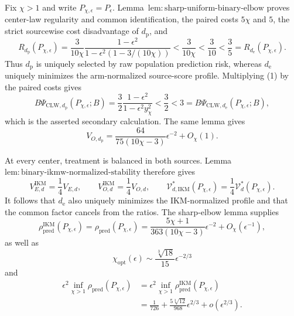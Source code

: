 Fix \(\chi>1\) and write \(P_{\chi,\epsilon}=P_\epsilon\). Lemma~\(\mathrm{lem{:}sharp\text{-}uniform\text{-}binary\text{-}elbow}\) proves center-law regularity and common identification, the paired costs \(5\chi\) and \(5\), the strict sourcewise cost disadvantage of \(d_{\mathrm p}\), and
\[
 R_{d_{\mathrm p}}(P_{\chi,\epsilon})
 =\frac{3}{10\chi}\frac{1-\epsilon^2}{1-\epsilon^2(1-3/(10\chi))}
 <\frac{3}{10\chi}<\frac3{10}<\frac35
 =R_{d_{\mathrm e}}(P_{\chi,\epsilon}). \tag{1}
\]
Thus \(d_{\mathrm p}\) is uniquely selected by raw population prediction risk, whereas \(d_{\mathrm e}\) uniquely minimizes the arm-normalized source-score profile. Multiplying (1) by the paired costs gives
\[
 B\Psi_{\mathrm{CLW},d_{\mathrm p}}(P_{\chi,\epsilon};B)
 =\frac32\frac{1-\epsilon^2}{1-\epsilon^2y_\chi^2}<\frac32<3
 =B\Psi_{\mathrm{CLW},d_{\mathrm e}}(P_{\chi,\epsilon};B), \tag{2}
\]
which is the asserted secondary calculation. The same lemma gives
\[
 V_{O,d_{\mathrm p}}
 =\frac{64}{75(10\chi-3)}\epsilon^{-2}+O_\chi(1). \tag{3}
\]

At every center, treatment is balanced in both sources. Lemma~\(\mathrm{lem{:}binary\text{-}ikmw\text{-}normalized\text{-}stability}\) therefore gives
\[
 V_{E,d}^{\mathrm{IKM}}=\frac14V_{E,d},
 \qquad V_{O,d}^{\mathrm{IKM}}=\frac14V_{O,d},
 \qquad
 \mathcal V_{d,\mathrm{IKM}}^*(P_{\chi,\epsilon})
 =\frac14\mathcal V_d^*(P_{\chi,\epsilon}). \tag{4}
\]
It follows that \(d_{\mathrm e}\) also uniquely minimizes the IKM-normalized profile and that the common factor cancels from the ratios. The sharp-elbow lemma supplies
\[
 \rho_{\mathrm{pred}}^{\mathrm{IKM}}(P_{\chi,\epsilon})
 =\rho_{\mathrm{pred}}(P_{\chi,\epsilon})
 =\frac{5\chi+1}{363(10\chi-3)}\epsilon^{-2}+O_\chi(\epsilon^{-1}), \tag{5}
\]
as well as
\[
 \chi_{\mathrm{opt}}(\epsilon)
 \sim\frac{\sqrt[3]{18}}{15}\epsilon^{-2/3} \tag{6}
\]
and
\[
\begin{aligned}
 \epsilon^2\inf_{\chi>1}\rho_{\mathrm{pred}}(P_{\chi,\epsilon})
 &=\epsilon^2\inf_{\chi>1}\rho_{\mathrm{pred}}^{\mathrm{IKM}}(P_{\chi,\epsilon})\\
 &=\frac1{726}+\frac{5\sqrt[3]{12}}{968}\epsilon^{2/3}+o(\epsilon^{2/3}). \tag{7}
\end{aligned}
\]

